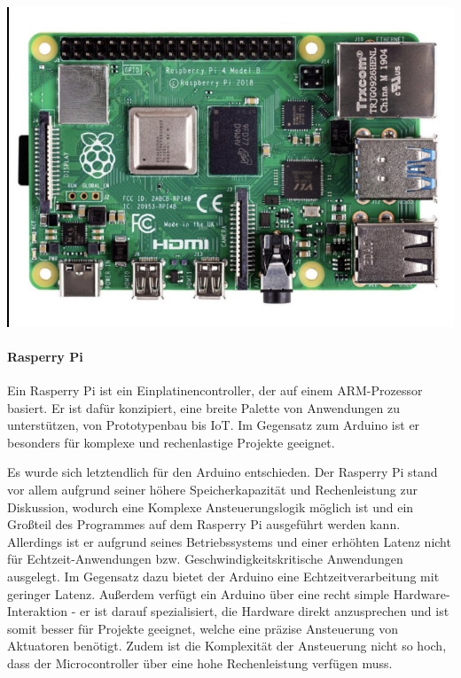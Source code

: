 \begin{minipage}{0.3\textwidth}
	\includegraphics [width=\textwidth] {img/RasperryPi}
\end{minipage}
\begin{minipage}{0.7\textwidth}
	\paragraph{Rasperry Pi}
	Ein Rasperry Pi ist ein Einplatinencontroller, der auf einem ARM-Prozessor basiert.
	Er ist dafür konzipiert, eine breite Palette von Anwendungen zu unterstützen, von Prototypenbau bis IoT.
	Im Gegensatz zum Arduino ist er besonders für komplexe und rechenlastige Projekte geeignet.
\end{minipage}
\newline

Es wurde sich letztendlich für den Arduino entschieden.
Der Rasperry Pi stand vor allem aufgrund seiner höhere Speicherkapazität und Rechenleistung zur Diskussion, wodurch eine Komplexe Ansteuerungslogik möglich ist und ein Großteil des Programmes auf dem Rasperry Pi ausgeführt werden kann.
Allerdings ist er aufgrund seines Betriebssystems und einer erhöhten Latenz nicht für Echtzeit-Anwendungen bzw. Geschwindigkeitskritische Anwendungen ausgelegt.
Im Gegensatz dazu bietet der Arduino eine Echtzeitverarbeitung mit geringer Latenz.
Außerdem verfügt ein Arduino über eine recht simple Hardware-Interaktion - er ist darauf spezialisiert, die Hardware direkt anzusprechen und ist somit besser für Projekte geeignet, welche eine präzise Ansteuerung von Aktuatoren benötigt.
Zudem ist die Komplexität der Ansteuerung nicht so hoch, dass der Microcontroller über eine hohe Rechenleistung verfügen muss.

